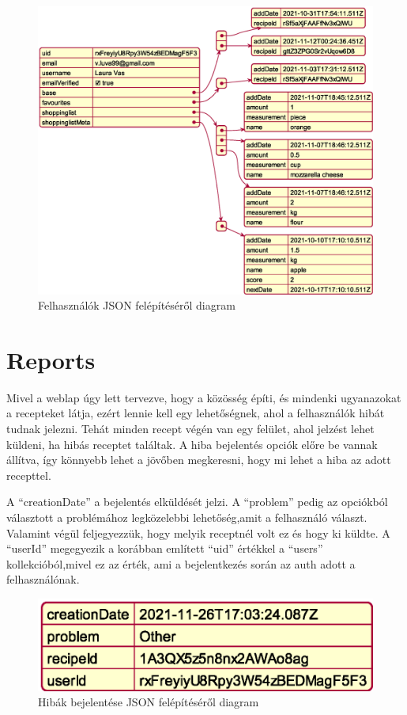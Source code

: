 \documentclass[12pt]{report}
\theoremstyle{definition}
\begin{document}
\noindent
\begin{figure}[H]
	\centering
	\includegraphics[width=\textwidth]{out/diagrams/jsonUsers/jsonUsers.eps}
	\caption{Felhasználók JSON felépítéséről diagram}
    \label{fig:jsonUsers}
\end{figure}

\section{Reports}
Mivel a weblap úgy lett tervezve, hogy a közösség építi, és mindenki ugyanazokat a recepteket látja, ezért lennie kell egy lehetőségnek, ahol a felhasználók hibát tudnak jelezni. Tehát minden recept végén van egy felület, ahol jelzést lehet küldeni, ha hibás receptet találtak. A hiba bejelentés opciók előre be vannak állítva, így könnyebb lehet a jövőben megkeresni, hogy mi lehet a hiba az adott recepttel. 

A “creationDate” a bejelentés elküldését jelzi. A “problem” pedig az opciókból választott a problémához legközelebbi lehetőség,amit a felhasználó választ. Valamint végül feljegyezzük, hogy melyik receptnél volt ez és hogy ki küldte. A “userId” megegyezik a korábban említett “uid” értékkel a “users” kollekcióból,mivel ez az érték, ami a bejelentkezés során az auth adott a felhasználónak.

\noindent
\begin{figure}[H]
	\centering
	\includegraphics[scale=0.6]{out/diagrams/jsonReports/jsonReports.eps}
	\caption{Hibák bejelentése JSON felépítéséről diagram}
    \label{fig:jsonReports}
\end{figure}
\end{document}
